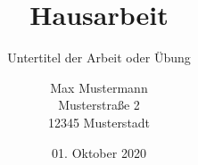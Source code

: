 \documentclass[]{jura}
\begin{document}
\title{Hausarbeit}
\subtitle{Untertitel der Arbeit oder Übung}
\author{%
    Max Mustermann\\
    Musterstraße 2\\
    12345 Musterstadt
}
\date{01. Oktober 2020}
\maketitle

\tableofcontents




\end{document}
